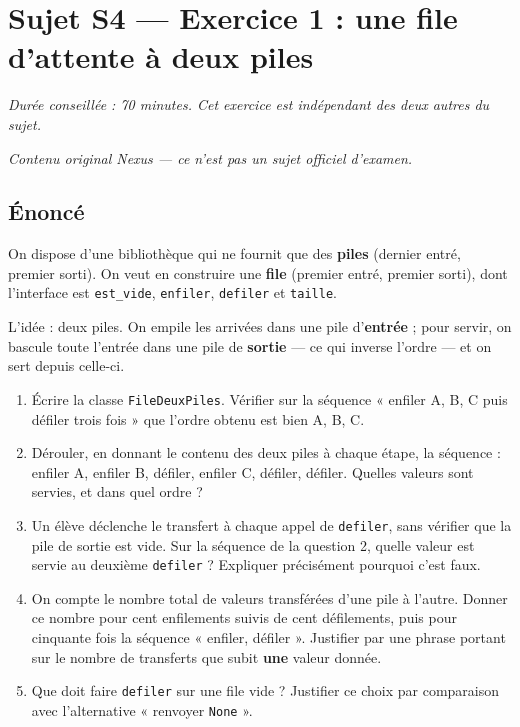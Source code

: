 \section*{Sujet S4 --- Exercice 1 : une file d'attente à deux piles}

\textit{Durée conseillée : 70 minutes. Cet exercice est indépendant des deux
autres du sujet.}

\medskip
\textit{Contenu original Nexus --- ce n'est pas un sujet officiel d'examen.}

\subsection*{Énoncé}

On dispose d'une bibliothèque qui ne fournit que des \textbf{piles} (dernier
entré, premier sorti). On veut en construire une \textbf{file} (premier entré,
premier sorti), dont l'interface est \lstinline{est_vide},
\lstinline{enfiler}, \lstinline{defiler} et \lstinline{taille}.

L'idée : deux piles. On empile les arrivées dans une pile d'\textbf{entrée} ;
pour servir, on bascule toute l'entrée dans une pile de \textbf{sortie} — ce
qui inverse l'ordre — et on sert depuis celle-ci.

\begin{enumerate}
  \item Écrire la classe \lstinline{FileDeuxPiles}. Vérifier sur la séquence
    « enfiler A, B, C puis défiler trois fois » que l'ordre obtenu est bien
    A, B, C.

  \item Dérouler, en donnant le contenu des deux piles à chaque étape, la
    séquence : enfiler A, enfiler B, défiler, enfiler C, défiler, défiler.
    Quelles valeurs sont servies, et dans quel ordre ?

  \item Un élève déclenche le transfert à chaque appel de \lstinline{defiler},
    sans vérifier que la pile de sortie est vide. Sur la séquence de la question
    2, quelle valeur est servie au deuxième \lstinline{defiler} ? Expliquer
    précisément pourquoi c'est faux.

  \item On compte le nombre total de valeurs transférées d'une pile à l'autre.
    Donner ce nombre pour cent enfilements suivis de cent défilements, puis pour
    cinquante fois la séquence « enfiler, défiler ». Justifier par une phrase
    portant sur le nombre de transferts que subit \textbf{une} valeur donnée.

  \item Que doit faire \lstinline{defiler} sur une file vide ? Justifier ce
    choix par comparaison avec l'alternative « renvoyer \lstinline{None} ».
\end{enumerate}

